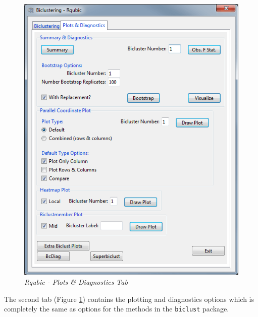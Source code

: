 \documentclass[a4paper]{article}\usepackage[]{graphicx}\usepackage[]{color}
\begin{document}
\begin{figure}[H]
\centering
\includegraphics[scale=0.5]{figures/rqubic_plotdiagtab.png}
\caption{{\it Rqubic - Plots \& Diagnostics Tab}\label{rqubic_plotdiagtab}}
\end{figure}
\noindent The second tab (Figure \ref{rqubic_plotdiagtab}) contains the plotting
and diagnostics options which is completely the same as options for the methods
in the \verb|biclust| package.
\end{document}
